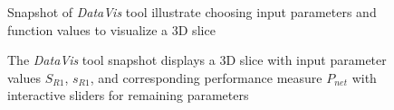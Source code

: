 \begin{figure}[!h]
    \begin{frame}{
    }
    \end{frame}
  \caption{Snapshot of \textit{DataVis} tool illustrate choosing input parameters and function values to visualize a 3D slice}
  \label{fig:DataVis_param_select}
\end{figure}
\begin{figure}[!t]  
  \hspace*{1.5cm}
  \begin{frame}{
    }
  \end{frame}
  \caption{The \textit{DataVis} tool snapshot displays a 3D slice with input parameter values $S_{R1}$, $s_{R1}$, and corresponding performance measure $P_{net}$ with interactive sliders for remaining parameters}
  \label{fig:DataVis_slice}
\end{figure}
